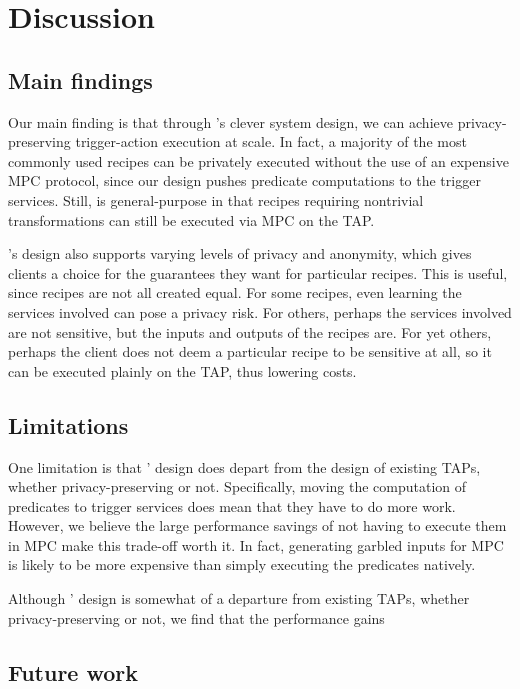 \section{Discussion}
\label{sec:discussion}

\subsection{Main findings}
Our main finding is that through \sys's clever system design, we can achieve
privacy-preserving trigger-action execution at scale. In fact, a majority of the
most commonly used recipes can be privately executed without the use of an
expensive MPC protocol, since our design pushes predicate computations to the
trigger services. Still, \sys is general-purpose in that recipes requiring
nontrivial transformations can still be executed via MPC on the TAP.

\sys's design also supports varying levels of privacy and anonymity, which gives
clients a choice for the guarantees they want for particular recipes. This is
useful, since recipes are not all created equal. For some recipes, even learning
the services involved can pose a privacy risk. For others, perhaps the services
involved are not sensitive, but the inputs and outputs of the recipes are. For
yet others, perhaps the client does not deem a particular recipe to be sensitive
at all, so it can be executed plainly on the TAP, thus lowering costs.
 
\subsection{Limitations}
One limitation is that \sys' design does depart from the design of existing
TAPs, whether privacy-preserving or not. Specifically, moving the computation of
predicates to trigger services does mean that they have to do more
work. However, we believe the large performance savings of not having to execute
them in MPC make this trade-off worth it. In fact, generating garbled inputs for
MPC is likely to be more expensive than simply executing the predicates
natively.

Although \sys' design is somewhat of a departure from existing TAPs, whether
privacy-preserving or not, we find that the performance gains

\subsection{Future work}


